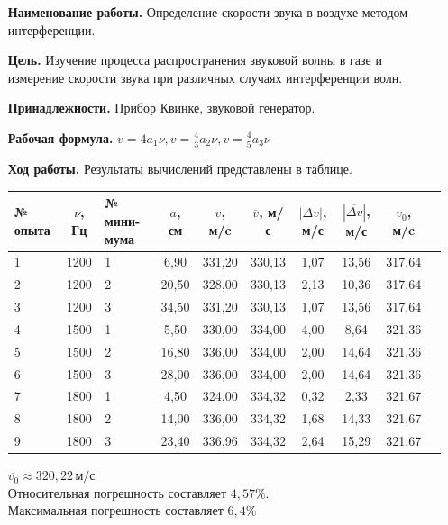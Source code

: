 \documentclass[otchet]{SCWorks}
\begin{document}
\begin{enumerate}[leftmargin=3.5cm]
    \item[\bf Наименование работы.] Определение скорости звука в воздухе методом интерференции.
    \item[\bf Цель.] Изучение процесса распространения звуковой волны в газе и измерение скорости звука при различных случаях интерференции волн.
    \item[\bf Принадлежности.] Прибор Квинке, звуковой генератор.
    \item[\bf Рабочая формула.] $v = 4a_1 \nu, v = \frac 4 3 a_2 \nu, v = \frac 4 5 a_3 \nu$
    \item[\bf Ход работы.] Результаты вычислений представлены в таблице.


    {\renewcommand{\arraystretch}{1.5}
    \setlength{\tabcolsep}{5pt}
        \begin{longtable}[h!]{ |C{1.5cm}|c|C{2cm}|c|c|c|c|c|c|c| }
            \hline
            {№ опыта} & $\nu$, Гц & № мини-мума & $a$, см & $v$, м/c & $\overline v$, м/с & $|\Delta v|$, м/с & $|\overline{\Delta v}|$, м/с & $v_0$, м/c \\
            \hline
             & 1200 & 1 & 6,90 & 331,20 & 330,13 & 1,07 & 13,56 & 317,64 \\
            2 & 1200 & 2 & 20,50 & 328,00 & 330,13 & 2,13 & 10,36 & 317,64 \\
            3 & 1200 & 3 & 34,50 & 331,20 & 330,13 & 1,07 & 13,56 & 317,64 \\
            4 & 1500 & 1 & 5,50 & 330,00 & 334,00 & 4,00 & 8,64 & 321,36 \\
            5 & 1500 & 2 & 16,80 & 336,00 & 334,00 & 2,00 & 14,64 & 321,36 \\
            6 & 1500 & 3 & 28,00 & 336,00 & 334,00 & 2,00 & 14,64 & 321,36 \\
            7 & 1800 & 1 & 4,50 & 324,00 & 334,32 & 0,32 & 2,33 & 321,67 \\
            8 & 1800 & 2 & 14,00 & 336,00 & 334,32 & 1,68 & 14,33 & 321,67 \\
            9 & 1800 & 3 & 23,40 & 336,96 & 334,32 & 2,64 & 15,29 & 321,67 \\
            \hline
        \end{longtable}}

$\overline{v_0} \approx 320,22\,\text{м}/\text{с}$ \\
Относительная погрешность составляет $4,57\%$. \\
Максимальная погрешность составляет $6,4\%$

\end{enumerate}
\end{document}
